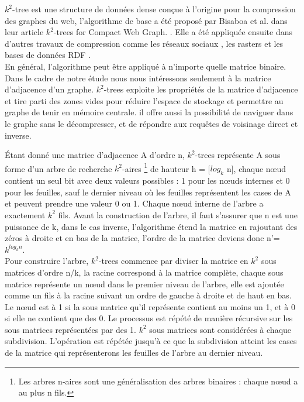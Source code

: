 $k^2$-tree est une structure de données dense conçue à l'origine pour la compression des graphes du web, l'algorithme de base a été proposé par Bisaboa et al. dans leur article $k^2$-trees for Compact Web Graph. \citep{brisaboa2009k}. Elle a été appliquée ensuite dans d'autres travaux de compression comme les réseaux sociaux \citep{shi2012optimizing}, les rasters \citep{de2013compact} et les bases de données RDF \citep{alvarez2017succinct}.\\

En général, l'algorithme peut être appliqué à n'importe quelle matrice binaire. Dans le cadre de notre étude nous nous intéressons seulement à la matrice d'adjacence d'un graphe.
$k^2$-trees exploite les propriétés de la matrice d'adjacence et tire parti des zones vides pour réduire l'espace de stockage et permettre au graphe de tenir en mémoire centrale. il offre aussi la possibilité de naviguer dans le graphe sans le décompresser, et de répondre aux requêtes de voisinage direct et inverse.

Étant donné une matrice d'adjacence A d'ordre n, $k^2$-trees représente A sous forme d'un arbre de recherche $k^2$-aires \footnote{Les arbres n-aires sont une généralisation des arbres binaires : chaque nœud a au plus n fils.} de hauteur h = [$log_{k}$ n], chaque nœud contient un seul bit avec deux valeurs possibles : 1 pour les nœuds internes et 0 pour les feuilles, sauf le dernier niveau où les feuilles représentent les cases de A et peuvent prendre une valeur 0 ou 1. Chaque nœud interne de l'arbre a exactement $k^2$ fils.  
Avant la construction de l'arbre, il faut s'assurer que n est une puissance de k, dans le cas inverse, l'algorithme étend la matrice en rajoutant des zéros à droite et en bas de la matrice, l'ordre de la matrice deviens donc n'= $k^{log_{k} n}$.\\

Pour construire l'arbre, $k^2$-trees commence par diviser la matrice en $k^{2}$ sous matrices d'ordre n/k, la racine correspond à la matrice complète, chaque sous matrice représente un nœud dans le premier niveau de l'arbre, elle est ajoutée comme un fils à la racine suivant un ordre de gauche à droite et de haut en bas. Le nœud est à 1 si la sous matrice qu'il représente contient au moins un 1, et à 0 si elle ne contient que des 0. Le processus est répété de manière récursive sur les sous matrices représentées par des 1. $k^{2}$ sous matrices sont considérées à chaque subdivision. L'opération est répétée jusqu'à ce que la subdivision atteint les cases de la matrice qui représenterons les feuilles de l'arbre au dernier niveau. 


